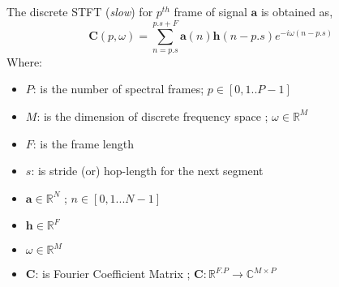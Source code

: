 The discrete STFT (\textit{slow}) for $p^{th}$ frame of signal $\textbf{a}$ is obtained as,
\begin{equation}
\textbf{C}(p, \omega ) = \displaystyle\sum_{n=p.s}^{p.s + F}\textbf{a}(n)\textbf{h}(n-p.s)e^{-i \omega (n-p.s)}
\end{equation}
Where:
\begin{itemize}[label=]
    \setlength\itemsep{0em}
    \item $P$: is the number of spectral frames; $p \in [0,1..P-1]$ 
    \item $M$: is the dimension of discrete frequency space ; $\omega \in \mathbb{R}^{M}$
    \item $F$: is the frame length 
    \item $s$: is stride (or) hop-length for the next segment
    \item $\textbf{a} \in  \mathbb{R}^{N}$ ; $n \in [0,1...N-1]$
    \item $\textbf{h} \in  \mathbb{R}^{F}$
    \item $\omega \in  \mathbb{R}^{M}$
    \item $\textbf{C}$: is Fourier Coefficient Matrix ; $\textbf{C} : \mathbb{R}^{F.P} \rightarrow \mathbb{C}^{M \times P}$
\end{itemize}

